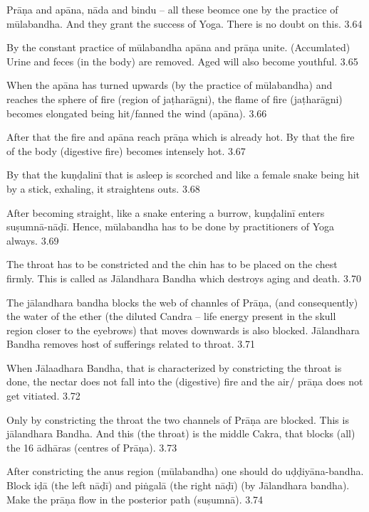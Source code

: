 
Prāṇa and apāna, nāda and bindu – all these beomce one by the practice of mūlabandha. And they grant the success of Yoga. There is no doubt on this.  3.64

By the constant practice of mūlabandha apāna and prāṇa unite. (Accumlated) Urine and feces (in the body) are removed. Aged will also become youthful. 3.65

When the apāna has turned upwards (by the practice of mūlabandha) and reaches the sphere of fire (region of jaṭharāgni), the flame of fire (jaṭharāgni) becomes elongated being hit/fanned the wind (apāna). 3.66

After that the fire and apāna reach prāṇa which is already hot. By that the fire of the body (digestive fire) becomes intensely hot. 3.67

By that the kuṇḍalinī that is asleep is scorched and like a female snake being hit by a stick, exhaling, it straightens outs. 3.68

After becoming straight, like a snake entering a burrow,   kuṇḍalinī enters suṣumnā-nāḍī. Hence, mūlabandha has to be done by practitioners of Yoga always. 3.69


The throat has to be constricted and the chin has to be placed on the chest firmly. This is called as Jālandhara Bandha which destroys aging and death.  3.70

The jālandhara bandha blocks the web of channles of Prāṇa, (and consequently) the water of the ether (the diluted Candra – life energy present in the skull region closer to the eyebrows) that moves downwards is also blocked. Jālandhara Bandha removes host of sufferings related to throat. 3.71


When Jālaadhara Bandha, that is characterized by constricting the throat is done, the nectar does not fall into the (digestive) fire and the air/ prāṇa does not get vitiated. 3.72

Only by constricting the throat the two channels of Prāṇa are blocked. This is jālandhara Bandha. And this (the throat) is the middle Cakra, that blocks (all) the 16 ādhāras (centres of Prāṇa). 3.73


After constricting the anus region (mūlabandha) one should do uḍḍiyāna-bandha. Block iḍā (the left nāḍī) and piṅgalā (the right nāḍī) (by Jālandhara bandha). Make the  prāṇa flow in the posterior path (suṣumnā).  3.74

